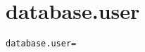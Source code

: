 \section{database.user}
\label{configuration:DatabaseUser}
\AvailableInJavaOnly{\TODO}
\begin{lstlisting}[style=Props,caption={Usage example for \textit{database.user}}]
database.user=
\end{lstlisting}